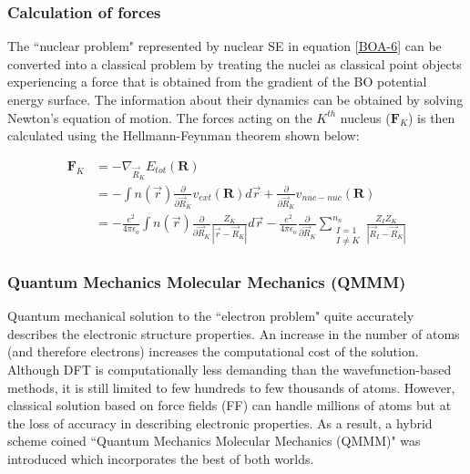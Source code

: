 
\subsubsection*{Calculation of forces}
\label{force}
\noindent The ``nuclear problem" represented by nuclear SE in equation {\ref{BOA-6}} can be converted into a classical problem by treating the nuclei as classical point objects experiencing a force that is obtained from the gradient of the BO potential energy surface. The information about their dynamics can be obtained by solving Newton's equation of motion. The forces acting on the $K^{th}$ nucleus ($\textbf{F}_K$) is then calculated using the Hellmann-Feynman theorem\cite{Feynman1939, Martin2004} shown below:

\begin{align}
\label{hfforce}
\textbf{F}_K&=-\nabla_{\vec{R}_K} E_{tot}(\textbf{R}) \\
             &=-\int n(\vec{r}) \frac{\partial }{\partial \vec{R}_K} v_{ext}(\textbf{R}) d\vec{r} + \frac{\partial }{\partial \vec{R}_K} v_{nuc-nuc}(\textbf{R})  \\
            &=-\frac{e^2}{4\pi \epsilon_o}\int n(\vec{r})\frac{\partial }{\partial \vec{R}_K}\frac{Z_K}{|\vec{r}-\vec{R}_K|} d\vec{r} - \frac{e^2}{4\pi \epsilon_o} \frac{\partial }{\partial \vec{R}_K} \sum_{\substack {I=1 \\ I\neq K}}^{n_n} \frac{Z_I Z_K}{|\vec{R}_I-\vec{R}_K|}
\end{align}
\noindent




\subsubsection{Quantum Mechanics Molecular Mechanics (QMMM)} \label{qmmm-sec}

\noindent Quantum mechanical solution to the ``electron problem" quite accurately describes the electronic structure properties. An increase in the number of atoms (and therefore electrons) increases the computational cost of the solution. Although DFT is computationally less demanding than the wavefunction-based methods, it is still limited to few hundreds to few thousands of atoms. However, classical solution based on force fields (FF) can handle millions of atoms but at the loss of accuracy in describing electronic properties. As a result, a hybrid scheme coined ``Quantum Mechanics Molecular Mechanics (QMMM)" was introduced which incorporates the best of both worlds.

